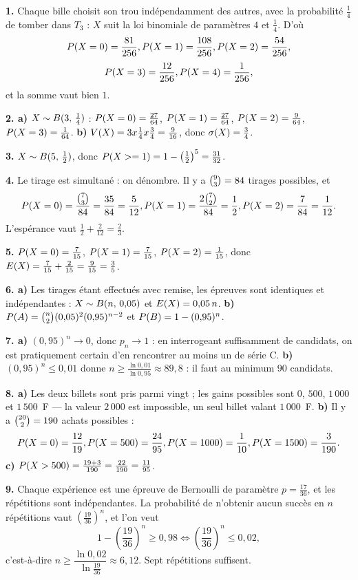 \begin{corrige}[annales]
\textbf{1.} Chaque bille choisit son trou indépendamment des autres, avec la
probabilité $\frac14$ de tomber dans $T_{3}$ : $X$ suit la loi binomiale de
paramètres $4$ et $\frac14$. D'où
\[
  \proba{X = 0} = \frac{81}{256}, \quad
  \proba{X = 1} = \frac{108}{256}, \quad
  \proba{X = 2} = \frac{54}{256},
\]
\[
  \proba{X = 3} = \frac{12}{256}, \quad
  \proba{X = 4} = \frac{1}{256},
\]
et la somme vaut bien $1$.

\textbf{2. a)} $X \sim \loibin{3}{\frac14}$ :
$\proba{X = 0} = \frac{27}{64}$, $\proba{X = 1} = \frac{27}{64}$,
$\proba{X = 2} = \frac{9}{64}$, $\proba{X = 3} = \frac{1}{64}$.
\textbf{b)} $\Var(X) = 3 \times \frac14 \times \frac34 = \frac{9}{16}$, donc
$\ecart(X) = \frac34$.

\textbf{3.} $X \sim \loibin{5}{\frac12}$, donc
$\proba{X \geq 1} = 1-\left(\frac12\right)^{5} = \frac{31}{32}$.

\textbf{4.} Le tirage est simultané : on dénombre. Il y a
$\combi{3}{9} = 84$ tirages possibles, et
\[
  \proba{X = 0} = \frac{\combi{3}{7}}{84} = \frac{35}{84} = \frac{5}{12},
  \quad
  \proba{X = 1} = \frac{2\combi{2}{7}}{84} = \frac12,
  \quad
  \proba{X = 2} = \frac{7}{84} = \frac{1}{12}.
\]
L'espérance vaut $\frac12+\frac{2}{12} = \frac23$.

\textbf{5.} $\proba{X = 0} = \frac{7}{15}$, $\proba{X = 1} = \frac{7}{15}$,
$\proba{X = 2} = \frac{1}{15}$, donc
$\Esp(X) = \frac{7}{15}+\frac{2}{15} = \frac{9}{15} = \frac35$.

\textbf{6. a)} Les tirages étant effectués avec remise, les épreuves sont
identiques et indépendantes : $X \sim \loibin{n}{0{,}05}$ et
$\Esp(X) = 0{,}05\,n$.
\textbf{b)} $\proba{A} = \combi{2}{n}(0{,}05)^{2}(0{,}95)^{n-2}$ et
$\proba{B} = 1-(0{,}95)^{n}$.

\textbf{7. a)} $(0{,}95)^{n} \to 0$, donc $p_{n} \to 1$ : en interrogeant
suffisamment de candidats, on est pratiquement certain d'en rencontrer au
moins un de série C.
\textbf{b)} $(0{,}95)^{n} \leq 0{,}01$ donne
$n \geq \frac{\ln0{,}01}{\ln0{,}95} \approx 89{,}8$ : il faut au minimum
$90$ candidats.

\textbf{8. a)} Les deux billets sont pris parmi vingt ; les gains possibles
sont $0$, $500$, $1\,000$ et $1\,500$~F — la valeur $2\,000$ est impossible,
un seul billet valant $1\,000$~F.
\textbf{b)} Il y a $\combi{2}{20} = 190$ achats possibles :
\[
  \proba{X = 0} = \frac{12}{19}, \quad
  \proba{X = 500} = \frac{24}{95}, \quad
  \proba{X = 1000} = \frac{1}{10}, \quad
  \proba{X = 1500} = \frac{3}{190}.
\]
\textbf{c)} $\proba{X>500} = \frac{19+3}{190} = \frac{22}{190}
= \frac{11}{95}$.

\textbf{9.} Chaque expérience est une épreuve de Bernoulli de paramètre
$p = \frac{17}{36}$, et les répétitions sont indépendantes. La probabilité de
n'obtenir aucun succès en $n$ répétitions vaut
$\left(\frac{19}{36}\right)^{n}$, et l'on veut
\[
  1-\left(\frac{19}{36}\right)^{n} \geq 0{,}98
  \iff \left(\frac{19}{36}\right)^{n} \leq 0{,}02,
\]
c'est-à-dire $n \geq \dfrac{\ln 0{,}02}{\ln\frac{19}{36}} \approx 6{,}12$.
Sept répétitions suffisent.
\end{corrige}

